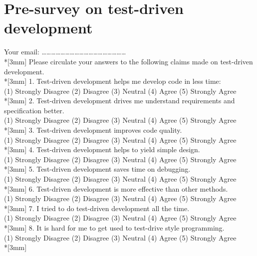 \chapter{Pre-survey on test-driven development}
\label{app:pre-survey}
\noindent Your email: \ldots\ldots\ldots\ldots\ldots\ldots\ldots\ldots\ldots\ldots\ldots\ldots\ldots\ldots\dots\ldots\ldots\ldots\\*[3mm]
Please circulate your answers to the following claims made on test-driven
development.\\*[3mm]
1. Test-driven development helps me develop code in less time: \\
(1) Strongly Disagree (2) Disagree (3) Neutral (4) Agree (5) Strongly Agree\\*[3mm]
2. Test-driven development drives me understand requirements and specification
better.\\
(1) Strongly Disagree (2) Disagree (3) Neutral (4) Agree (5) Strongly Agree\\*[3mm]
3. Test-driven development improves code quality. \\
(1) Strongly Disagree (2) Disagree (3) Neutral (4) Agree (5) Strongly Agree\\*[3mm]
4. Test-driven development helps to yield simple design.\\
(1) Strongly Disagree (2) Disagree (3) Neutral (4) Agree (5) Strongly Agree\\*[3mm]
5. Test-driven development saves time on debugging. \\
(1) Strongly Disagree (2) Disagree (3) Neutral (4) Agree (5) Strongly Agree\\*[3mm]
6. Test-driven development is more effective than other methods.\\
(1) Strongly Disagree (2) Disagree (3) Neutral (4) Agree (5) Strongly Agree\\*[3mm]
7. I tried to do test-driven development all the time.\\
(1) Strongly Disagree (2) Disagree (3) Neutral (4) Agree (5) Strongly Agree\\*[3mm]
8. It is hard for me to get used to test-drive style programming.\\
(1) Strongly Disagree (2) Disagree (3) Neutral (4) Agree (5) Strongly Agree\\*[3mm]

